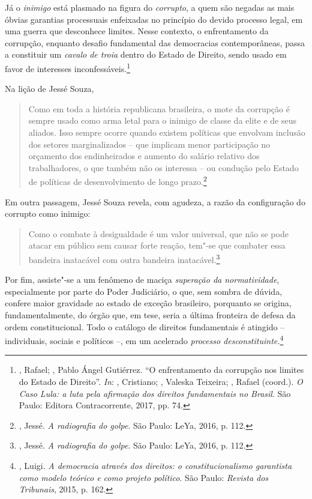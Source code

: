 Já o \emph{inimigo} está plasmado na figura do \emph{corrupto}, a quem
são negadas as mais óbvias garantias processuais enfeixadas no princípio
do devido processo legal, em uma guerra que desconhece limites. Nesse
contexto, o enfrentamento da corrupção, enquanto desafio fundamental das
democracias contemporâneas, passa a constituir um \emph{cavalo de troia}
dentro do Estado de Direito, sendo usado em favor de interesses
inconfessáveis.\footnote{, Rafael; , Pablo Ángel
  Gutiérrez. ``O enfrentamento da corrupção nos limites do Estado de
  Direito''. \emph{In}:  , Cristiano;  , Valeska
  Teixeira; , Rafael (coord.). \emph{O Caso Lula: a luta pela
  afirmação dos direitos fundamentais no Brasil}. São Paulo: Editora
  Contracorrente, 2017, pp. 74.}

Na lição de Jessé Souza,

\begin{quote}
Como em toda a história republicana brasileira, o mote da corrupção é
sempre usado como arma letal para o inimigo de classe da elite e de seus
aliados. Isso sempre ocorre quando existem políticas que envolvam
inclusão dos setores marginalizados -- que implicam menor participação
no orçamento dos endinheirados e aumento do salário relativo dos
trabalhadores, o que também não os interessa -- ou condução pelo Estado
de políticas de desenvolvimento de longo prazo.\footnote{, Jessé.
  \emph{A radiografia do golpe}. São Paulo: LeYa, 2016, p. 112.}
\end{quote}

Em outra passagem, Jessé Souza revela, com agudeza, a razão da
configuração do corrupto como inimigo:

\begin{quote}
Como o combate à desigualdade é
um valor universal, que não se pode atacar em público sem causar forte
reação, tem"-se que combater essa bandeira inatacável com outra bandeira
inatacável.\footnote{, Jessé. \emph{A radiografia do golpe}. São
  Paulo: LeYa, 2016, p. 112.}
\end{quote}

Por fim, assiste"-se a um fenômeno de maciça \emph{superação da
normatividade}, especialmente por parte do Poder Judiciário, o que, sem
sombra de dúvida, confere maior gravidade ao estado de exceção
brasileiro, porquanto se origina, fundamentalmente, do órgão que, em
tese, seria a última fronteira de defesa da ordem constitucional. Todo o
catálogo de direitos fundamentais é atingido -- individuais, sociais e
políticos --, em um acelerado \emph{processo desconstituinte.}\footnote{,
  Luigi. \emph{A democracia através dos direitos: o constitucionalismo
  garantista como modelo teórico e como projeto político}. São Paulo:
  \emph{Revista dos Tribunais}, 2015, p. 162.}

